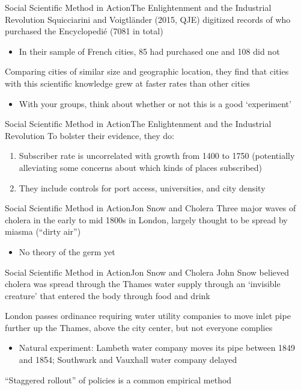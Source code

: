 \documentclass[aspectratio=169,t,11pt,table]{beamer}
\begin{document}
\begin{frame}{Social Scientific Method in Action}{The Enlightenment and the Industrial Revolution}
  Squicciarini and Voigtländer (2015, QJE) digitized records of who purchased the Encyclopedié (7081 in total)
  \begin{itemize}
    \item In their sample of French cities, 85 had purchased one and 108 did not
  \end{itemize}
  
  \bigskip
  Comparing cities of similar size and geographic location, they find that cities with this scientific knowledge grew at faster rates than other cities
  \begin{itemize}
    \item With your groups, think about whether or not this is a good `experiment'  
  \end{itemize}
\end{frame}

\begin{frame}{Social Scientific Method in Action}{The Enlightenment and the Industrial Revolution}
  To bolster their evidence, they do:
  \begin{enumerate}
    \item Subscriber rate is uncorrelated with growth from 1400 to 1750 (potentially alleviating some concerns about which kinds of places subscribed)
    
    \item They include controls for port access, universities, and city density
  \end{enumerate}
\end{frame}

\begin{frame}{Social Scientific Method in Action}{Jon Snow and Cholera}
  Three major waves of cholera in the early to mid 1800s in London, largely thought to be spread by miasma (``dirty air'')
  \begin{itemize}
    \item No theory of the germ yet
  \end{itemize}
\end{frame}

\begin{frame}{Social Scientific Method in Action}{Jon Snow and Cholera}
  John Snow believed cholera was spread through the Thames water supply through an `invisible creature' that entered the body through food and drink
  
  \bigskip
  London passes ordinance requiring water utility companies to move inlet pipe further up the Thames, above the city center, but not everyone complies
  \begin{itemize}
    \item Natural experiment: Lambeth water company moves its pipe between 1849 and 1854; Southwark and Vauxhall water company delayed
  \end{itemize}

  \bigskip
  ``Staggered rollout'' of policies is a common empirical method
\end{frame}
\end{document}
